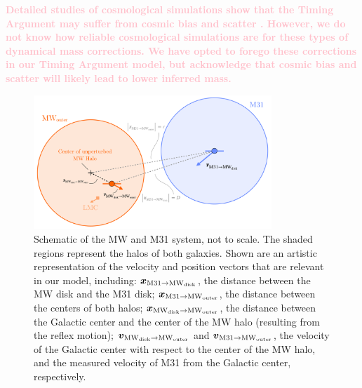 \documentclass[twocolumn]{aastex631}
\newcommand{\kc}[1]{\textcolor{pink}{\textbf{#1}} }
\newcommand{\bov}{\ensuremath{\boldsymbol{v}}}
\newcommand{\pos}[2]{\ensuremath{\boldsymbol{x}_{\rm #1 \to #2}}}
\newcommand{\vel}[2]{\ensuremath{\bov_{\rm #1 \to #2}}}
\newcommand{\mwouter}{\ensuremath{\textrm{MW}_\textrm{outer}}}
\newcommand{\mwdisk}{\ensuremath{\textrm{MW}_\textrm{disk}}}
\begin{document}
\kc{Detailed studies of cosmological simulations show that the Timing Argument 
may suffer from cosmic bias and scatter 
\citep{LiWhite2008,Gonzalez2014,Hartl2021}\todo{more citations?}. 
However, we do not know how reliable cosmological simulations are for these 
types of dynamical mass corrections. 
We have opted to forego these corrections in our Timing Argument model, but
acknowledge that cosmic bias and scatter will likely lead to lower inferred 
mass.}


\begin{figure}[htb]
  \centering
  \includegraphics[width=0.8\textwidth]{schematic-filled.pdf}
  \caption{
    Schematic of the MW and M31 system, not to scale. The shaded regions
    represent the halos of both galaxies. Shown are an artistic representation
    of the velocity and position vectors that are relevant in our model,
    including: $\pos{M31}{\mwdisk}$, the distance between the MW disk and the
    M31 disk;
    $\pos{M31}{\mwouter}$, the distance between the centers of both halos;
    $\pos{\mwdisk}{\mwouter}$, the distance between the Galactic center and the
    center of the MW halo (resulting from the reflex motion);
    $\vel{\mwdisk}{\mwouter}$ and $\vel{M31}{\mwouter}$, the velocity of the
    Galactic center with respect to the center of the MW halo, and the measured
    velocity of M31 from the Galactic center, respectively.
  }
  \label{fig:schematic}
\end{figure}
\end{document}
